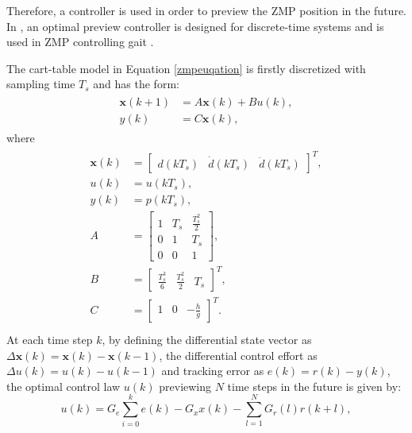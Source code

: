 
Therefore, a controller is used in order to preview the ZMP position in the future. In \cite{katayama1985design}, an optimal preview controller is designed for discrete-time systems and is used in ZMP controlling gait 
\cite{kajita2003biped,czarnetzki2009observer,gouaillier2010omni,strom2009omnidirectional}.

The cart-table model in Equation {\ref{zmpeuqation}} is firstly discretized with sampling time $ T_s $ and has the form:
\begin{align}
\label{discretesystem}
\begin{split}
\bm{x}(k+1)&=A\bm{x}(k)+Bu(k),\\
y(k)&=C\bm{x}(k),
\end{split}
\end{align}
where 
\begin{align*}
\begin{split}
\bm{x}(k) &= \begin{bmatrix}
d(kT_s)&\dot{d}(kT_s)&\ddot{d}(kT_s)
\end{bmatrix}^T,\\
u(k)&=u(kT_s),\\
y(k)&=p(kT_s),\\
A&=\begin{bmatrix}
1&T_s&\frac{T_s^2}{2}\\0&1&T_s\\0&0&1
\end{bmatrix},\\
B&=\begin{bmatrix}
\frac{T_s^3}{6}&\frac{T_s^2}{2}&T_s
\end{bmatrix}^T,\\
C&=\begin{bmatrix}
1&0&-\frac{h}{g}
\end{bmatrix}^T.\\
\end{split}
\end{align*}
At each time step $ k $, by defining the differential state vector as $ \Delta\bm{x}(k)=\bm{x}(k) -\bm{x}(k-1)$, the differential control effort as $ \Delta u(k)=u(k)-u(k-1) $ and tracking error as $ e(k)=r(k)-y(k) $, the optimal control law $ u(k) $ previewing $ N  $ time steps in the future is given by: 
\begin{equation}
\label{optimalprecontrol}
u(k)= G_e\sum_{i=0}^{k}e(k)-G_xx(k)-\sum_{l=1}^{N}G_r(l)r(k+l),	
\end{equation}
